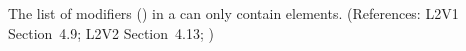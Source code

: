 The list of modifiers () in a \Reaction can only
contain  elements.  (References: L2V1
Section~4.9; L2V2 Section~4.13; )
